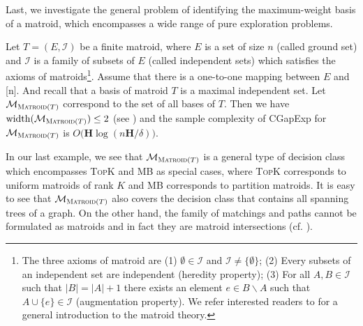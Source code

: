 \documentclass{article}
\newcommand{\Algorithm}{{\small \textsf{CGapExp}}\xspace}
\newcommand{\M}{\mathcal M}
\newcommand{\del}{\backslash}
\DeclareMathOperator{\rank}{width}
\newcommand{\MultiIdent}{\textsc{TopK}\xspace}
\newcommand{\MultiBandit}{\textsc{MB}\xspace}
\newcommand{\Matroid}{\textsc{Matroid}\xspace}
\begin{document}
Last, we investigate the general problem of identifying the maximum-weight basis of a matroid, which encompasses a wide range of pure exploration problems.
\begin{example}[Matroids]
\label{example:matroid}
Let $T=(E,\mathcal I)$ be a finite matroid, where $E$ is a set of size $n$ (called ground set) and $\mathcal I$ is a family of subsets of $E$ (called independent sets) which satisfies the axioms of matroids\footnote{The three axioms of matroid are (1) $\emptyset\in \mathcal I$ and $\mathcal I\not=\{\emptyset\}$; (2) Every subsets of an independent set are independent (heredity property); (3) For all $A,B\in \mathcal I$ such that $|B|=|A|+1$ there exists an element $e\in B\del A$ such that $A\cup \{e\} \in \mathcal I$ (augmentation property). We refer interested readers to \citep{oxley2006matroid} for a general introduction to the matroid theory.}.
Assume that there is a one-to-one mapping between $E$ and [n].
And recall that a basis of matroid $T$ is a maximal independent set.
Let $\M_{\Matroid(T)}$ correspond to the set of all bases of $T$.
Then we have $\rank(\M_{\Matroid(T)}) \le 2$ (see ) and the sample complexity of \Algorithm for $\M_{\Matroid(T)}$ is $O\big(\mathbf H \log(n\mathbf H/\delta)\big)$.
\end{example}
In our last example, we see that $\M_{\Matroid(T)}$ is a general type of decision class which encompasses \MultiIdent and \MultiBandit as special cases, where \MultiIdent corresponds to uniform matroids of rank $K$ and \MultiBandit corresponds to partition matroids.
It is easy to see that $\M_{\Matroid(T)}$ also covers the decision class that contains all spanning trees of a graph.
On the other hand, the family of matchings and paths cannot be formulated as matroids and in fact they are matroid intersections (cf. \citep{oxley2006matroid}).
\end{document}
